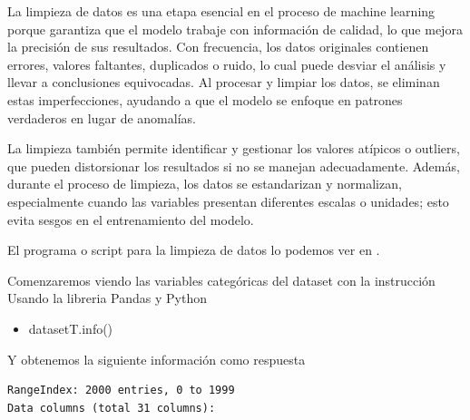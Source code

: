 La limpieza de datos es una etapa esencial en el proceso de machine learning porque garantiza 
que el modelo trabaje con información de calidad, lo que mejora la precisión de sus resultados. 
Con frecuencia, los datos originales contienen errores, valores faltantes, duplicados o ruido, 
lo cual puede desviar el análisis y llevar a conclusiones equivocadas. Al procesar y limpiar los 
datos, se eliminan estas imperfecciones, ayudando a que el modelo se enfoque en patrones verdaderos
en lugar de anomalías. \medskip

La limpieza también permite identificar y gestionar los valores atípicos o outliers, que pueden 
distorsionar los resultados si no se manejan adecuadamente. Además, durante el proceso de 
limpieza, los datos se estandarizan y normalizan, especialmente cuando las variables presentan 
diferentes escalas o unidades; esto evita sesgos en el entrenamiento del modelo. \medskip

El programa o script para la limpieza de datos lo podemos ver en \cite{roh1} . \medskip

Comenzaremos viendo las variables categóricas del dataset con la instrucción Usando la libreria Pandas y 
Python\medskip
\begin{tcolorbox}[colback=gray!20, colframe=gray!80, width=\textwidth]
\begin{itemize}
\item datasetT.info()
\end{itemize}
\end{tcolorbox}
\newpage
Y obtenemos la siguiente información como respuesta

\begin{verbatim}
RangeIndex: 2000 entries, 0 to 1999 
Data columns (total 31 columns):
\end{verbatim}

